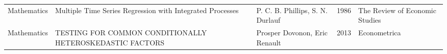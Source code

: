 \begin{xltabular}[p]{\hsize}{sYsrs}
                    Mathematics &                                                                       Multiple Time Series Regression with Integrated Processes &                              P. C. B. Phillips, S. N. Durlauf & 1986 &         The Review of Economic Studies \\
                    Mathematics &                                                                        TESTING FOR COMMON CONDITIONALLY HETEROSKEDASTIC FACTORS &                                 Prosper Dovonon, Eric Renault & 2013 &                           Econometrica \\


\end{xltabular}
